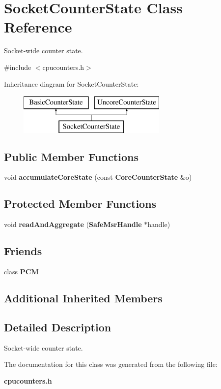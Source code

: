 \section{Socket\+Counter\+State Class Reference}
\label{classSocketCounterState}


Socket-\/wide counter state.  




{\ttfamily \#include $<$cpucounters.\+h$>$}

Inheritance diagram for Socket\+Counter\+State\+:\begin{figure}[H]
\begin{center}
\leavevmode
\includegraphics[height=2.000000cm]{classSocketCounterState}
\end{center}
\end{figure}
\subsection*{Public Member Functions}
\begin{DoxyCompactItemize}
\item 
void {\bfseries accumulate\+Core\+State} (const {\bf Core\+Counter\+State} \&o)\label{classSocketCounterState_aa23362a4685d2abad8c2c7264bb47eab}

\end{DoxyCompactItemize}
\subsection*{Protected Member Functions}
\begin{DoxyCompactItemize}
\item 
void {\bfseries read\+And\+Aggregate} ({\bf Safe\+Msr\+Handle} $\ast$handle)\label{classSocketCounterState_a6525d0eda2a11ad906b16cb05ee5c0e5}

\end{DoxyCompactItemize}
\subsection*{Friends}
\begin{DoxyCompactItemize}
\item 
class {\bfseries P\+C\+M}\label{classSocketCounterState_ab5f56d2e95ba3daf52c17b8a1d356d64}

\end{DoxyCompactItemize}
\subsection*{Additional Inherited Members}


\subsection{Detailed Description}
Socket-\/wide counter state. 

The documentation for this class was generated from the following file\+:\begin{DoxyCompactItemize}
\item 
{\bf cpucounters.\+h}\end{DoxyCompactItemize}
